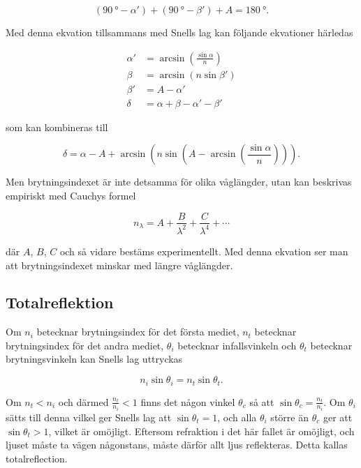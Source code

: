 \documentclass[a4paper]{article}
\begin{document}
  \begin{equation} \label{eq:triSum}
  	(\SI{90}{\degree} - \alpha') + (\SI{90}{\degree} - \beta') + A = \SI{180}{\degree}\text{.}
  \end{equation}
  
  Med denna ekvation tillsammans med Snells lag kan följande ekvationer härledas

  \begin{align} 
  \label{eq:alphaPrim}
  \alpha' &= \arcsin\left(\frac{\sin\alpha}{n}\right)\\
  \label{eq:beta}
  \beta &= \arcsin\left(n \sin\beta'\right)\\
  \label{eq:betaPrim}
  \beta' &= A-\alpha'\\
  \label{eq:delta}
  \delta &= \alpha+\beta-\alpha'-\beta'
  \end{align}
  
  som kan kombineras till

  \begin{equation} \label{eq:avlänkning}
  	\delta = \alpha-A+\arcsin\left(n \sin\left(A-\arcsin\left(\frac{\sin\alpha}{n}\right)\right)\right)\text{.}
  \end{equation}
  
  Men brytningsindexet är inte detsamma för olika våglängder, utan kan beskrivas empiriskt med Cauchys formel
  
  \begin{equation} \label{eq:cauchy}
  	n_\lambda = A + \frac{B}{\lambda^2} + \frac{C}{\lambda^4} + \cdots
  \end{equation}
  
  där $A$, $B$, $C$ och så vidare bestäms experimentellt. Med denna ekvation ser man att brytningsindexet minskar med längre våglängder.

\subsection{Totalreflektion}

	Om $n_i$ betecknar brytningsindex för det första mediet, $n_t$ betecknar brytningsindex för det andra mediet, $\theta_i$ betecknar infallsvinkeln och $\theta_t$ betecknar brytningsvinkeln kan Snells lag uttryckas \cite[pp.~21--22]{pearsonIntroOpt}
	
	\begin{equation} \label{eq:snell}
		n_i\sin\theta_i = n_t\sin\theta_t\text{.}
	\end{equation}
	
	Om $n_t < n_i$ och därmed $\frac{n_t}{n_i} < 1$ finns det någon vinkel $\theta_c$ så att $\sin\theta_c = \frac{n_t}{n_i}$. Om $\theta_i$ sätts till denna vilkel ger Snells lag att $\sin\theta_t = 1$, och alla $\theta_i$ större än $\theta_c$ ger att $\sin\theta_t > 1$, vilket är omöjligt. Eftersom refraktion i det här fallet är omöjligt, och ljuset måste ta vägen någonstans, måste därför allt ljus reflekteras. Detta kallas totalreflection.
	
\end{document}
